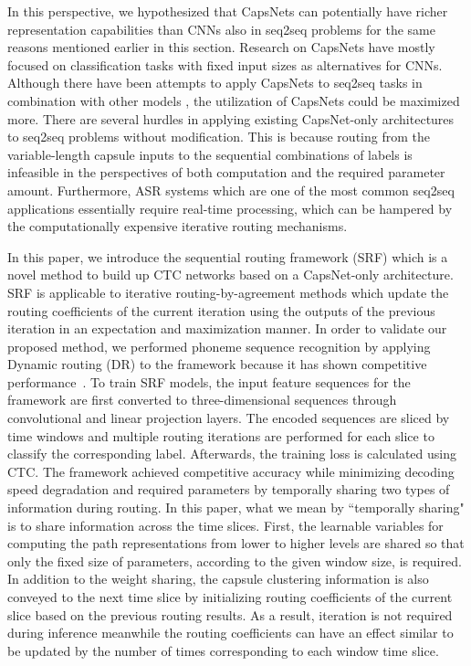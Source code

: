 \documentclass[review]{elsarticle}
\begin{document}
In this perspective, we hypothesized that CapsNets can potentially have richer representation capabilities than CNNs also in seq2seq problems for the same reasons mentioned earlier in this section.
Research on CapsNets have mostly focused on classification tasks with fixed input sizes as alternatives for CNNs.
Although there have been attempts to apply CapsNets to seq2seq tasks in combination with other models \citep{8852016, wang-2019-towards}, the utilization of CapsNets could be maximized more.
There are several hurdles in applying existing CapsNet-only architectures to seq2seq problems without modification.
This is because routing from the variable-length capsule inputs to the sequential combinations of labels is infeasible in the perspectives of both computation and the required parameter amount.
Furthermore, ASR systems which are one of the most common seq2seq applications essentially require real-time processing, which can be hampered by the computationally expensive iterative routing mechanisms. 

In this paper, we introduce the sequential routing framework (SRF) which is a novel method to build up CTC networks based on a CapsNet-only architecture.
SRF is applicable to iterative routing-by-agreement methods \citep{DBLP:conf/nips/SabourFH17, DBLP:conf/iclr/HintonSF18} which update the routing coefficients of the current iteration using the outputs of the previous iteration in an expectation and maximization manner.
In order to validate our proposed method, we performed phoneme sequence recognition by applying Dynamic routing (DR) \citep{DBLP:conf/nips/SabourFH17} to the framework because it has shown competitive performance~\citep{DBLP:conf/nips/HahnPK19, Malmgren1314210}.
To train SRF models, the input feature sequences for the framework are first converted to three-dimensional sequences through convolutional and linear projection layers.
The encoded sequences are sliced by time windows and multiple routing iterations are performed for each slice to classify the corresponding label.
Afterwards, the training loss is calculated using CTC.
The framework achieved competitive accuracy while minimizing decoding speed degradation and required parameters by temporally sharing two types of information during routing.
In this paper, what we mean by ``temporally sharing" is to share information across the time slices.
First, the learnable variables for computing the path representations from lower to higher levels are shared so that only the fixed size of parameters, according to the given window size, is required.
In addition to the weight sharing, the capsule clustering information is also conveyed to the next time slice by initializing routing coefficients of the current slice based on the previous routing results.
As a result, iteration is not required during inference meanwhile the routing coefficients can have an effect similar to be updated by the number of times corresponding to each window time slice.
\end{document}
